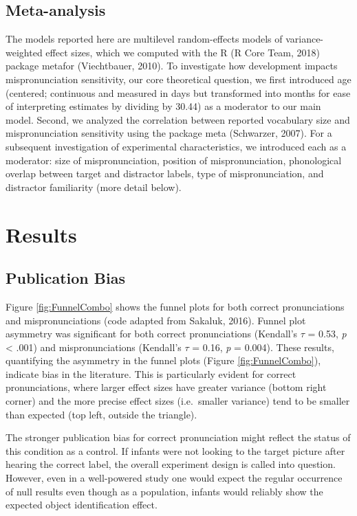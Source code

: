 \documentclass[man]{apa6}
\begin{document}
\hypertarget{meta-analysis}{%
\subsection{Meta-analysis}\label{meta-analysis}}

The models reported here are multilevel random-effects models of variance-weighted effect sizes, which we computed with the R (R Core Team, 2018) package metafor (Viechtbauer, 2010). To investigate how development impacts mispronunciation sensitivity, our core theoretical question, we first introduced age (centered; continuous and measured in days but transformed into months for ease of interpreting estimates by dividing by 30.44) as a moderator to our main model. Second, we analyzed the correlation between reported vocabulary size and mispronunciation sensitivity using the package meta (Schwarzer, 2007). For a subsequent investigation of experimental characteristics, we introduced each as a moderator: size of mispronunciation, position of mispronunciation, phonological overlap between target and distractor labels, type of mispronunciation, and distractor familiarity (more detail below).

\hypertarget{results}{%
\section{Results}\label{results}}

\hypertarget{publication-bias-1}{%
\subsection{Publication Bias}\label{publication-bias-1}}

Figure \ref{fig:FunnelCombo} shows the funnel plots for both correct pronunciations and mispronunciations (code adapted from Sakaluk, 2016). Funnel plot asymmetry was significant for both correct pronunciations (Kendall's \(\tau\) = 0.53, \emph{p} \textless{} .001) and mispronunciations (Kendall's \(\tau\) = 0.16, \emph{p} = 0.004). These results, quantifying the asymmetry in the funnel plots (Figure \ref{fig:FunnelCombo}), indicate bias in the literature. This is particularly evident for correct pronunciations, where larger effect sizes have greater variance (bottom right corner) and the more precise effect sizes (i.e.~smaller variance) tend to be smaller than expected (top left, outside the triangle).

The stronger publication bias for correct pronunciation might reflect the status of this condition as a control. If infants were not looking to the target picture after hearing the correct label, the overall experiment design is called into question. However, even in a well-powered study one would expect the regular occurrence of null results even though as a population, infants would reliably show the expected object identification effect.
\end{document}
